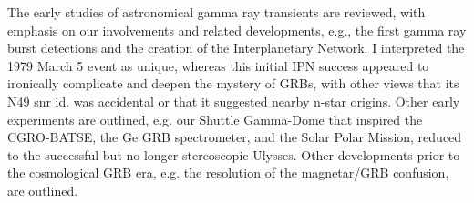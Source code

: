 


\bigskip



\bigskip

\noindent The early studies of astronomical gamma ray transients are reviewed, with emphasis on our involvements and related developments, e.g., the first gamma ray burst detections and the creation of the Interplanetary Network. I interpreted the 1979 March 5 event as unique, whereas this initial IPN success appeared to ironically complicate and deepen the mystery of GRBs, with other views that its N49 snr id. was accidental or that it suggested nearby n-star origins. Other early experiments are outlined, e.g. our Shuttle Gamma-Dome that inspired the CGRO-BATSE, the Ge GRB spectrometer, and the Solar Polar Mission, reduced to the successful but no longer stereoscopic Ulysses. Other developments prior to the cosmological GRB era, e.g. the resolution of the magnetar/GRB confusion, are outlined.

